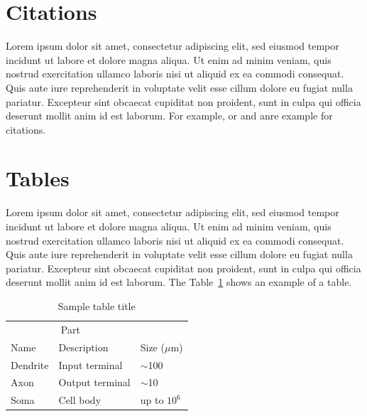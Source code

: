 \documentclass{article}
\begin{document}
\section{Citations}

Lorem ipsum dolor sit amet, consectetur adipiscing elit, sed eiusmod tempor incidunt ut labore et dolore magna aliqua. Ut enim ad minim veniam, quis nostrud exercitation ullamco laboris nisi ut aliquid ex ea commodi consequat. Quis aute iure reprehenderit in voluptate velit esse cillum dolore eu fugiat nulla pariatur. Excepteur sint obcaecat cupiditat non proident, sunt in culpa qui officia deserunt mollit anim id est laborum. 
For example, \cite{reference_1} or \cite{reference_2} and \cite{reference_3} anre example for citations.

\section{Tables}

Lorem ipsum dolor sit amet, consectetur adipiscing elit, sed eiusmod tempor incidunt ut labore et dolore magna aliqua. Ut enim ad minim veniam, quis nostrud exercitation ullamco laboris nisi ut aliquid ex ea commodi consequat. Quis aute iure reprehenderit in voluptate velit esse cillum dolore eu fugiat nulla pariatur. Excepteur sint obcaecat cupiditat non proident, sunt in culpa qui officia deserunt mollit anim id est laborum. The Table~\ref{sample-table} shows an example of a table.

\begin{table}[H]
  \caption{Sample table title}
  \label{sample-table}
  \centering
  \begin{tabular}{lll}
    \toprule
    \multicolumn{2}{c}{Part}                   \\
    \cmidrule(r){1-2}
    Name     & Description     & Size ($\mu$m) \\
    \midrule
    Dendrite & Input terminal  & $\sim$100     \\
    Axon     & Output terminal & $\sim$10      \\
    Soma     & Cell body       & up to $10^6$  \\
    \bottomrule
  \end{tabular}
\end{table}
\end{document}
